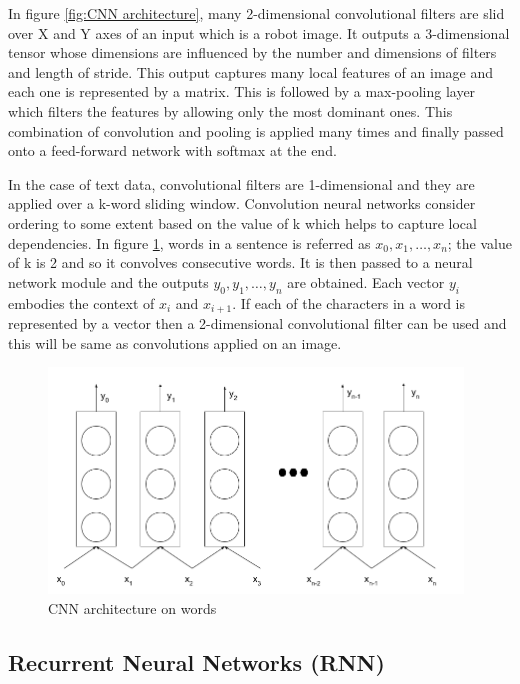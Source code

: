 \documentclass[a4paper, 11pt]{article}
\begin{document}
In figure \ref{fig:CNN architecture}, many 2-dimensional convolutional filters are slid over X and Y axes of an input which is a robot image. It outputs a 3-dimensional tensor whose dimensions are influenced by the number and dimensions of filters and length of stride. This output captures many local features of an image and each one is represented by a matrix. This is followed by a max-pooling layer which filters the features by allowing only the most dominant ones. This combination of convolution and pooling is applied many times and finally passed onto a feed-forward network with softmax at the end. 

In the case of text data, convolutional filters are 1-dimensional and they are applied over a k-word sliding window. Convolution neural networks consider ordering to some extent based on the value of k which helps to capture local dependencies. In figure \ref{fig:Char CNN architecture}, words in a sentence is referred as $x_0, x_1, \dots, x_n$; the value of k is 2 and so it convolves consecutive words. It is then passed to a neural network module and the outputs $y_0, y_1, \dots, y_n$ are obtained. Each vector $y_i$ embodies the context of $x_i$ and $x_{i+1}$. If each of the characters in a word is represented by a vector then a 2-dimensional convolutional filter can be used and this will be same as convolutions applied on an image.
\begin{figure}[H]
    \centering
    \includegraphics[width=\textwidth,height=6cm,keepaspectratio=true]
    {cnn-2.png}
    \caption{
        CNN architecture on words
    }
    \label{fig:Char CNN architecture}
\end{figure}


\subsection{Recurrent Neural Networks (RNN)}

\end{document}
